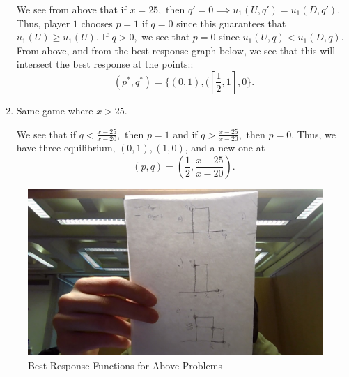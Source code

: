 \documentclass[11pt]{article}
\begin{document}
\begin{problem}
\begin{enumerate}
    
\begin{solution}
    We see from above that if $x = 25,$ then $q' = 0 \implies u_1(U,q') = u_1(D, q').$ Thus, player $1$ chooses $p=1$ if $q=0$ since this guarantees that $u_1(U)\geq u_1(U).$ If $q>0,$ we see that $p=0$ since $u_1(U,q)< u_1(D,q).$ From above, and from the best response graph below, we see that this will intersect the best response at the points::
    \[(p^*, q^*) = \{(0,1), ([\frac{1}{2},1], 0\}.\]
\end{solution}

\item 
\begin{problem}
    Same game where $x>25.$
\end{problem}
\begin{solution}
    We see that if $q< \frac{x-25}{x-20},$ then $p = 1$ and if $q>\frac{x-25}{x-20},$ then $p = 0.$ Thus, we have three equilibrium, $(0,1), (1,0)$, and a new one at
    \[(p,q) = (\frac{1}{2}, \frac{x-25}{x-20}).\]
\end{solution}
    \end{enumerate}
\begin{figure}[H]
    \centering
    \includegraphics[width=0.5\linewidth]{Images/WIN_20250216_16_09_31_Pro.jpg}
    \caption{Best Response Functions for Above Problems}
\end{figure}
\end{problem}

\newpage
\end{document}
